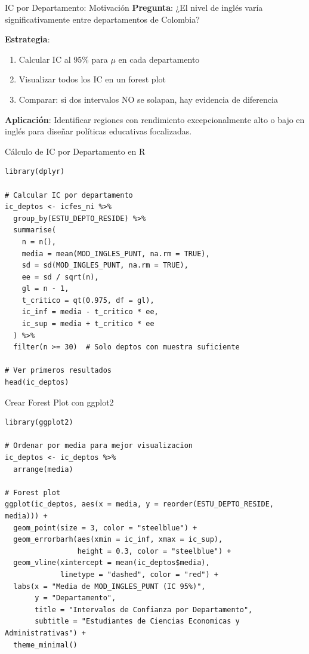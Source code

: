 \documentclass[aspectratio=169, 11pt]{beamer}
\begin{document}
\begin{frame}{IC por Departamento: Motivación}
\textbf{Pregunta}: ¿El nivel de inglés varía significativamente entre departamentos de Colombia?

\vspace{0.3cm}
\textbf{Estrategia}:
\begin{enumerate}
  \item Calcular IC al 95\% para $\mu$ en cada departamento
  \item Visualizar todos los IC en un \alert{forest plot}
  \item Comparar: si dos intervalos NO se solapan, hay evidencia de diferencia
\end{enumerate}

\vspace{0.3cm}
\textbf{Aplicación}: Identificar regiones con rendimiento excepcionalmente alto o bajo en inglés para diseñar políticas educativas focalizadas.
\end{frame}

\begin{frame}[fragile]{Cálculo de IC por Departamento en R}
\begin{lstlisting}[basicstyle=\ttfamily\scriptsize]
library(dplyr)

# Calcular IC por departamento
ic_deptos <- icfes_ni %>%
  group_by(ESTU_DEPTO_RESIDE) %>%
  summarise(
    n = n(),
    media = mean(MOD_INGLES_PUNT, na.rm = TRUE),
    sd = sd(MOD_INGLES_PUNT, na.rm = TRUE),
    ee = sd / sqrt(n),
    gl = n - 1,
    t_critico = qt(0.975, df = gl),
    ic_inf = media - t_critico * ee,
    ic_sup = media + t_critico * ee
  ) %>%
  filter(n >= 30)  # Solo deptos con muestra suficiente

# Ver primeros resultados
head(ic_deptos)
\end{lstlisting}
\end{frame}

\begin{frame}[fragile]{Crear Forest Plot con ggplot2}
\begin{lstlisting}
library(ggplot2)

# Ordenar por media para mejor visualizacion
ic_deptos <- ic_deptos %>%
  arrange(media)

# Forest plot
ggplot(ic_deptos, aes(x = media, y = reorder(ESTU_DEPTO_RESIDE, media))) +
  geom_point(size = 3, color = "steelblue") +
  geom_errorbarh(aes(xmin = ic_inf, xmax = ic_sup),
                 height = 0.3, color = "steelblue") +
  geom_vline(xintercept = mean(ic_deptos$media),
             linetype = "dashed", color = "red") +
  labs(x = "Media de MOD_INGLES_PUNT (IC 95%)",
       y = "Departamento",
       title = "Intervalos de Confianza por Departamento",
       subtitle = "Estudiantes de Ciencias Economicas y Administrativas") +
  theme_minimal()
\end{lstlisting}
\end{frame}
\end{document}
